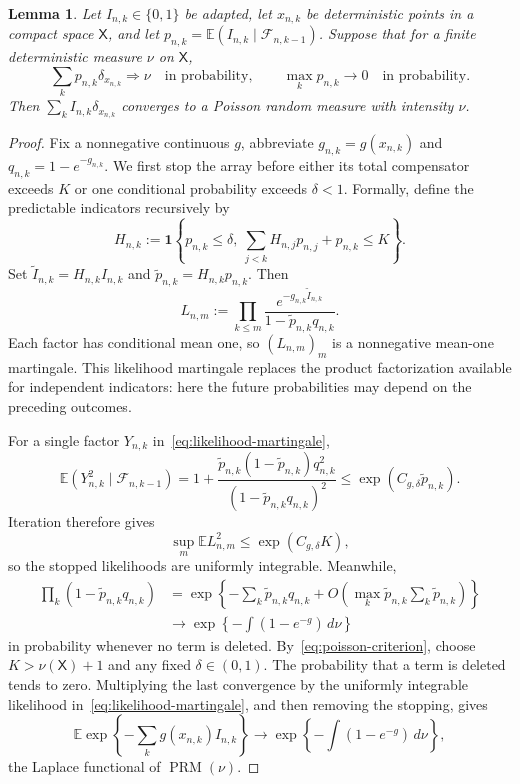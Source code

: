 \documentclass[11pt]{article}
\newtheorem{lemma}[theorem]{Lemma}
\theoremstyle{remark}
\theoremstyle{plain}
\newcommand{\E}{\mathbb E}
\newcommand{\one}{\mathbf 1}
\newcommand{\cF}{\mathcal F}
\begin{document}
\begin{lemma}\label{lem:predictable-poisson}
Let $I_{n,k}\in\{0,1\}$ be adapted, let $x_{n,k}$ be deterministic points in
a compact space $\mathsf X$, and let
$p_{n,k}=\E(I_{n,k}\mid\cF_{n,k-1})$.  Suppose that for a finite deterministic
measure $\nu$ on $\mathsf X$,
\begin{equation}\label{eq:poisson-criterion}
 \sum_kp_{n,k}\delta_{x_{n,k}}\Longrightarrow\nu
 \quad\text{in probability},
 \qquad
 \max_kp_{n,k}\longrightarrow0
 \quad\text{in probability}.
\end{equation}
Then $\sum_k I_{n,k}\delta_{x_{n,k}}$ converges to a Poisson random measure
with intensity $\nu$.
\end{lemma}

\begin{proof}
Fix a nonnegative continuous $g$, abbreviate
$g_{n,k}=g(x_{n,k})$ and $q_{n,k}=1-e^{-g_{n,k}}$.  We first stop the array
before either its total compensator exceeds $K$ or one conditional
probability exceeds $\delta<1$.  Formally, define the predictable indicators
recursively by
\[
 H_{n,k}:=\one\left\{p_{n,k}\le\delta,
 \ \sum_{j<k}H_{n,j}p_{n,j}+p_{n,k}\le K\right\}.
\]
Set
$\widetilde I_{n,k}=H_{n,k}I_{n,k}$ and
$\widetilde p_{n,k}=H_{n,k}p_{n,k}$.  Then
\begin{equation}\label{eq:likelihood-martingale}
 L_{n,m}:=\prod_{k\le m}
 \frac{e^{-g_{n,k}\widetilde I_{n,k}}}
 {1-\widetilde p_{n,k}q_{n,k}}.
\end{equation}
Each factor has conditional mean one, so $(L_{n,m})_m$ is a nonnegative
mean-one martingale.  This likelihood martingale replaces the product
factorization available for independent indicators: here the future
probabilities may depend on the preceding outcomes.

For a single factor $Y_{n,k}$ in~\eqref{eq:likelihood-martingale},
\[
 \E(Y_{n,k}^2\mid\cF_{n,k-1})
 =1+\frac{\widetilde p_{n,k}(1-\widetilde p_{n,k})q_{n,k}^2}
 {(1-\widetilde p_{n,k}q_{n,k})^2}
 \le \exp(C_{g,\delta}\widetilde p_{n,k}).
\]
Iteration therefore gives
\begin{equation}\label{eq:likelihood-L2}
 \sup_m\E L_{n,m}^2
 \le \exp(C_{g,\delta}K),
\end{equation}
so the stopped likelihoods are uniformly integrable.  Meanwhile,
\begin{align*}
 \prod_k(1-\widetilde p_{n,k}q_{n,k})
 &=\exp\left\{-\sum_k\widetilde p_{n,k}q_{n,k}
       +O\left(\max_k\widetilde p_{n,k}
                    \sum_k\widetilde p_{n,k}\right)\right\}\\
 &\longrightarrow
 \exp\left\{-\int(1-e^{-g})\,d\nu\right\}
\end{align*}
in probability whenever no term is deleted.  By~\eqref{eq:poisson-criterion},
choose $K>\nu(\mathsf X)+1$ and any fixed $\delta\in(0,1)$.  The probability
that a term is deleted tends to zero.  Multiplying the last convergence by
the uniformly integrable likelihood in~\eqref{eq:likelihood-martingale}, and
then removing the stopping, gives
\[
 \E\exp\left\{-\sum_k g(x_{n,k})I_{n,k}\right\}
 \longrightarrow
 \exp\left\{-\int(1-e^{-g})\,d\nu\right\},
\]
the Laplace functional of $\operatorname{PRM}(\nu)$.
\end{proof}
\end{document}
